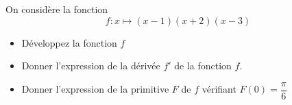 \bexo
On considère la fonction
\begin{equation}
	f:x\mapsto (x-1)(x+2)(x-3)
\end{equation}
\begin{itemize}
	\item Développez la fonction $f$
	\item Donner l'expression de la dérivée $f'$ de la fonction $f$.
	\item Donner l'expression de la primitive $F$ de $f$ vérifiant $F(0)=\dfrac{\pi}{6}$
\end{itemize}
	\ifsolutions \else 
\vspace*{10cm}
\fi 
\eexo
{}

